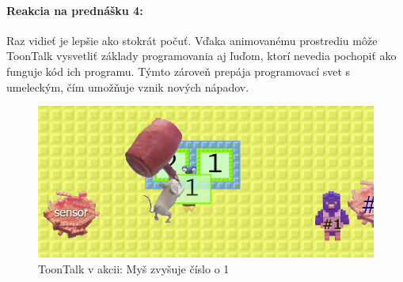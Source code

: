 \documentclass[slovak,a4paper,10pt]{article}
\begin{document}
\paragraph{Reakcia na prednášku 4:}
Raz vidieť je lepšie ako stokrát počuť. Vďaka animovanému prostrediu môže ToonTalk vysvetliť základy programovania aj ľuďom, ktorí nevedia pochopiť ako funguje kód ich programu. Týmto zároveň prepája programovací svet s umeleckým, čím umožňuje vznik nových nápadov.
\begin{figure}[h]
\includegraphics[scale=0.4]{toontalkmain}
\centering
\caption{ToonTalk v akcii: Myš zvyšuje číslo o 1}
\label{fig:obr1}
\end{figure}
\end{document}
